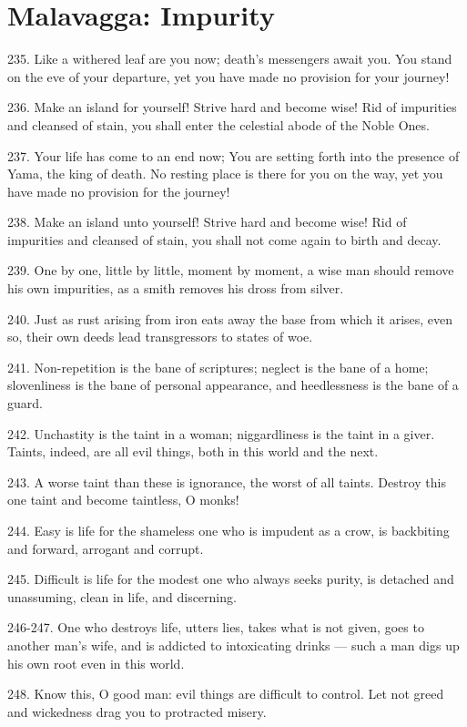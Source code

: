 \newpage
\chapter{Malavagga: Impurity}
235. Like a withered leaf are you now; death's messengers await you. You stand on the eve of your departure, yet you have made no provision for your journey!

236. Make an island for yourself! Strive hard and become wise! Rid of impurities and cleansed of stain, you shall enter the celestial abode of the Noble Ones.

237. Your life has come to an end now; You are setting forth into the presence of Yama, the king of death. No resting place is there for you on the way, yet you have made no provision for the journey!

238. Make an island unto yourself! Strive hard and become wise! Rid of impurities and cleansed of stain, you shall not come again to birth and decay.

239. One by one, little by little, moment by moment, a wise man should remove his own impurities, as a smith removes his dross from silver.

240. Just as rust arising from iron eats away the base from which it arises, even so, their own deeds lead transgressors to states of woe.

241. Non-repetition is the bane of scriptures; neglect is the bane of a home; slovenliness is the bane of personal appearance, and heedlessness is the bane of a guard.

242. Unchastity is the taint in a woman; niggardliness is the taint in a giver. Taints, indeed, are all evil things, both in this world and the next.

243. A worse taint than these is ignorance, the worst of all taints. Destroy this one taint and become taintless, O monks!

244. Easy is life for the shameless one who is impudent as a crow, is backbiting and forward, arrogant and corrupt.

245. Difficult is life for the modest one who always seeks purity, is detached and unassuming, clean in life, and discerning.

246-247. One who destroys life, utters lies, takes what is not given, goes to another man's wife, and is addicted to intoxicating drinks — such a man digs up his own root even in this world.

248. Know this, O good man: evil things are difficult to control. Let not greed and wickedness drag you to protracted misery.

